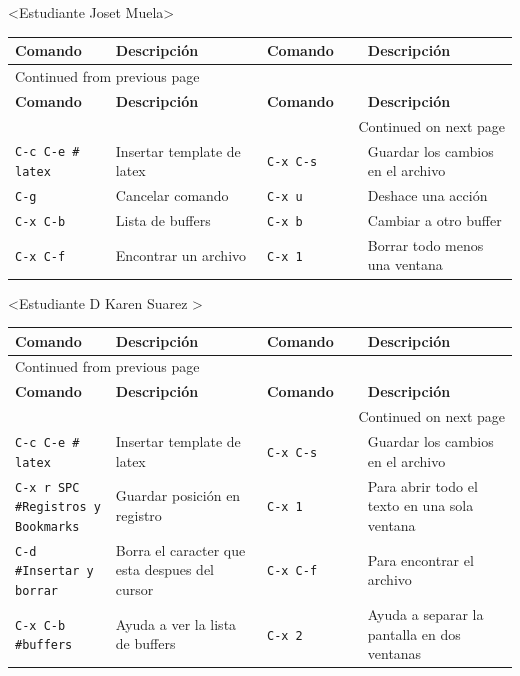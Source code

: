 \documentclass{article}
\begin{document}
<Estudiante Joset Muela>
\begin{longtable}{|p{0.2\linewidth}|p{0.3\linewidth}|p{0.2\linewidth}|p{0.3\linewidth}|}
\textbf{Comando} & \textbf{Descripción} & \textbf{Comando} & \textbf{Descripción}\\[0pt]
\hline
\endfirsthead
\multicolumn{4}{l}{Continued from previous page} \\[0pt]
\hline

\textbf{Comando} & \textbf{Descripción} & \textbf{Comando} & \textbf{Descripción} \\[0pt]

\hline
\endhead
\hline\multicolumn{4}{r}{Continued on next page} \\
\endfoot
\endlastfoot
\hline
\texttt{C-c C-e \# latex} & Insertar template de  latex & \texttt{C-x C-s} & Guardar los cambios en el archivo\\[0pt]
\texttt{C-g} & Cancelar comando & \texttt{C-x u} & Deshace una acción\\[0pt]
\texttt{C-x C-b} & Lista de buffers & \texttt{C-x b} & Cambiar a otro buffer\\[0pt]
\texttt{C-x C-f} & Encontrar un archivo & \texttt{C-x 1} & Borrar todo menos una ventana\\[0pt]
\end{longtable}

<Estudiante D Karen Suarez >
\begin{longtable}{|p{0.2\linewidth}|p{0.3\linewidth}|p{0.2\linewidth}|p{0.3\linewidth}|}
\textbf{Comando} & \textbf{Descripción} & \textbf{Comando} & \textbf{Descripción}\\[0pt]
\hline
\endfirsthead
\multicolumn{4}{l}{Continued from previous page} \\[0pt]
\hline

\textbf{Comando} & \textbf{Descripción} & \textbf{Comando} & \textbf{Descripción} \\[0pt]

\hline
\endhead
\hline\multicolumn{4}{r}{Continued on next page} \\
\endfoot
\endlastfoot
\hline
\texttt{C-c C-e \# latex} & Insertar template de  latex & \texttt{C-x C-s} & Guardar los cambios en el archivo\\[0pt]
\texttt{C-x r SPC \#Registros y Bookmarks} & Guardar posición en registro & \texttt{C-x 1} & Para abrir todo el texto en una sola ventana\\[0pt]
\texttt{C-d \#Insertar y borrar} & Borra el caracter que esta despues del cursor & \texttt{C-x C-f} & Para encontrar el archivo\\[0pt]
\texttt{C-x C-b \#buffers} & Ayuda a ver la lista de buffers & \texttt{C-x 2} & Ayuda a separar la pantalla en dos ventanas\\[0pt]
\end{longtable}
\end{document}
